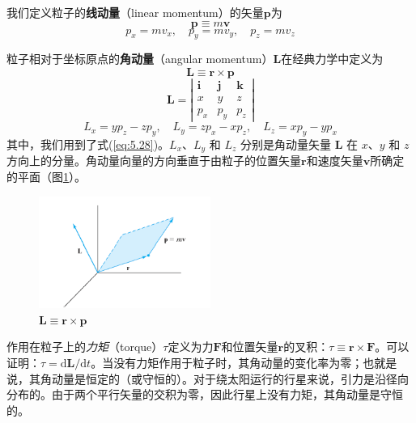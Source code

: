     我们定义粒子的\textbf{线动量}（linear momentum）的矢量$\mathbf{p}$为
    \begin{equation}
        \boxed{
            \mathbf{p} \equiv m\mathbf{v}
        }
        \label{eq:5.35}
    \end{equation}
    \begin{equation}
        p_x = mv_x, \quad p_y = mv_y, \quad p_z = mv_z
        \label{eq:5.36}
    \end{equation}

    粒子相对于坐标原点的\textbf{角动量}（angular momentum）$\mathbf{L}$在经典力学中定义为
    \begin{equation}
        \boxed{
            \mathbf{L} \equiv \mathbf{r} \times \mathbf{p}
        }
        \label{eq:5.37}
    \end{equation}
    \begin{equation}
        \mathbf{L} = \left|
            \begin{array}{ccc}
            \mathbf{i} & \mathbf{j} & \mathbf{k} \\
            x & y & z \\
            p_x & p_y & p_z
            \end{array}
            \right|
        \label{eq:5.38}
    \end{equation}
    \begin{equation}
        L_x = yp_z - zp_y, \quad L_y = zp_x - xp_z, \quad L_z = xp_y - yp_x
        \label{eq:5.39}
    \end{equation}
    其中，我们用到了式(\ref{eq:5.28})。$L_x$、$L_y$ 和 $L_z$ 分别是角动量矢量 $\mathbf{L}$ 在 $x$、$y$ 和 $z$ 方向上的分量。角动量向量的方向垂直于由粒子的位置矢量$\mathbf{r}$和速度矢量$\mathbf{v}$所确定的平面（图\ref{fig:5.4}）。
    \begin{figure}[ht]
        \centering
        \includegraphics[width=0.5\textwidth]{Figures/5.4.png}
        \caption{$\mathbf{L \equiv \mathbf{r} \times \mathbf{p}}$}
        \label{fig:5.4}
    \end{figure}

    作用在粒子上的\textit{力矩}（torque）$\tau$定义为力$\mathbf{F}$和位置矢量$\mathbf{r}$的叉积：$\tau \equiv \mathbf{r} \times \mathbf{F}$。可以证明：$\tau = \mathrm{d}\mathbf{L} / \mathrm{d}t$。当没有力矩作用于粒子时，其角动量的变化率为零；也就是说，其角动量是恒定的（或守恒的）。对于绕太阳运行的行星来说，引力是沿径向分布的。由于两个平行矢量的交积为零，因此行星上没有力矩，其角动量是守恒的。

